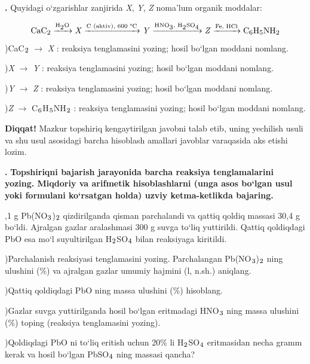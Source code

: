 \documentclass[11pt,a4paper]{article}
\renewcommand{\textsubscript}[1]{\ensuremath{_{\text{\fontsize{8}{8}\selectfont #1}}}}
\newcommand{\qn}[1]{\textbf{\fontsize{11.5}{13}\selectfont #1}}
\newcommand{\qsep}{\par\vspace{1pt}\noindent\rule{0pt}{0.4pt}\par\vspace{5pt}}
\newcommand{\diqqat}[1]{\par\smallskip\noindent\textbf{Diqqat!} #1\par\medskip}
\begin{document}
\noindent\qn{42.} Quyidagi o`zgarishlar zanjirida \textit{X}, \textit{Y}, \textit{Z} noma'lum organik moddalar:\par
\[\setlength{\fboxsep}{0pt}\text{CaC\textsubscript{2}}\xrightarrow{\text{H\textsubscript{2}O}}\text{\textit{X}}\xrightarrow{\text{C (aktiv), 600 \textdegree{}C}}\text{\textit{Y}}\xrightarrow{\text{HNO\textsubscript{3}, H\textsubscript{2}SO\textsubscript{4}}}\text{\textit{Z}}\xrightarrow{\text{Fe, HCl}}\text{C\textsubscript{6}H\textsubscript{5}NH\textsubscript{2}}\]
)CaC\textsubscript{2} $\to$ \textit{X} : reaksiya tenglamasini yozing; hosil bo`lgan moddani nomlang.\par
{})\textit{X} $\to$ \textit{Y} : reaksiya tenglamasini yozing; hosil bo`lgan moddani nomlang.\par
{})\textit{Y} $\to$ \textit{Z} : reaksiya tenglamasini yozing; hosil bo`lgan moddani nomlang.\par
{})\textit{Z} $\to$ C\textsubscript{6}H\textsubscript{5}NH\textsubscript{2} : reaksiya tenglamasini yozing; hosil bo`lgan moddani nomlang.\par
\diqqat{Mazkur topshiriq kengaytirilgan javobni talab etib, uning yechilish usuli va shu usul asosidagi barcha hisoblash amallari javoblar varaqasida aks etishi lozim.}\qsep
\noindent\qn{43.} \textbf{Topshiriqni bajarish jarayonida barcha reaksiya tenglamalarini yozing. Miqdoriy va arifmetik hisoblashlarni (unga asos bo`lgan usul yoki formulani ko`rsatgan holda) uzviy ketma-ketlikda bajaring.}\par{},1 g Pb(NO\textsubscript{3})\textsubscript{2} qizdirilganda qisman parchalandi va qattiq qoldiq massasi 30,4 g bo`ldi. Ajralgan gazlar aralashmasi 300 g suvga to`liq yuttirildi. Qattiq qoldiqdagi PbO esa mo`l suyultirilgan H\textsubscript{2}SO\textsubscript{4} bilan reaksiyaga kiritildi.\par
{})Parchalanish reaksiyasi tenglamasini yozing. Parchalangan Pb(NO\textsubscript{3})\textsubscript{2} ning ulushini (\%) va ajralgan gazlar umumiy hajmini (l, n.sh.) aniqlang.\par
{})Qattiq qoldiqdagi PbO ning massa ulushini (\%) hisoblang.\par
{})Gazlar suvga yuttirilganda hosil bo`lgan eritmadagi HNO\textsubscript{3} ning massa ulushini (\%) toping (reaksiya tenglamasini yozing).\par
{})Qoldiqdagi PbO ni to`liq eritish uchun 20\% li H\textsubscript{2}SO\textsubscript{4} eritmasidan necha gramm kerak va hosil bo`lgan PbSO\textsubscript{4} ning massasi qancha?\par
\end{document}
